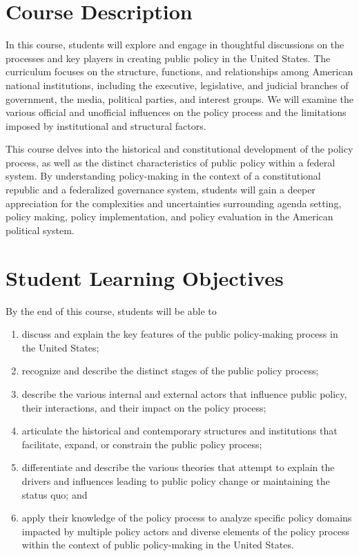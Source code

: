 \documentclass[11pt, letterpaper]{article}
\begin{document}
\section{Course Description}

	In this course, students will explore and engage in thoughtful discussions on the processes and key players in creating public policy in the United States. The curriculum focuses on the structure, functions, and relationships among American national institutions, including the executive, legislative, and judicial branches of government, the media, political parties, and interest groups. We will examine the various official and unofficial influences on the policy process and the limitations imposed by institutional and structural factors.

    \vspace{1ex}

	\noindent This course delves into the historical and constitutional development of the policy process, as well as the distinct characteristics of public policy within a federal system. By understanding policy-making in the context of a constitutional republic and a federalized governance system, students will gain a deeper appreciation for the complexities and uncertainties surrounding agenda setting, policy making, policy implementation, and policy evaluation in the American political system.

\section{Student Learning Objectives}

By the end of this course, students will be able to

\begin{enumerate}
	\item discuss and explain the key features of the public policy-making process in the United States;
	\item recognize and describe the distinct stages of the public policy process;
	\item describe the various internal and external actors that influence public policy, their interactions, and their impact on the policy process;
	\item articulate the historical and contemporary structures and institutions that facilitate, expand, or constrain the public policy process;
	\item differentiate and describe the various theories that attempt to explain the drivers and influences leading to public policy change or maintaining the status quo; and
	\item apply their knowledge of the policy process to analyze specific policy domains impacted by multiple policy actors and diverse elements of the policy process within the context of public policy-making in the United States.
\end{enumerate}
\end{document}
